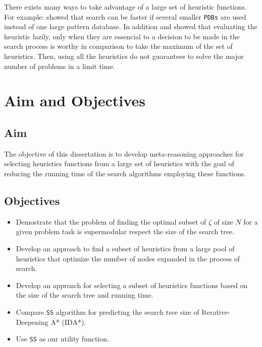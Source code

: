There exists many ways to take advantage of a large set of heuristic functions. For example: \cite{holte2006maximizing} showed that search can be faster if several smaller \texttt{PDBs} are used instead of one large pattern database. In addition \cite{domshlak2010max} and \cite{tolpin2013towards} showed that evaluating the heuristic lazily, only when they are essencial to a decision to be made in the search process is worthy in comparison to take the maximum of the set of heuristics. Then, using all the heuristics do not guarantees to solve the major number of problems in a limit time.
\section{Aim and Objectives}
\subsection{Aim}
\noindent
The objective of this dissertation is to develop meta-reasoning approaches for selecting heuristics functions from a large set of heuristics with the goal of reducing the running time of the search algorithms employing these functions.

\subsection{Objectives}
\noindent

\begin{itemize}
  \item Demostrate that the problem of finding the optimal subset of $\zeta$ of size $N$ for a given problem task is supermodular respect the size of the search tree.
  
  \item Develop an approach to find a subset of heuristics from a large pool of heuristics that optimize the number of nodes expanded in the process of search.
  
  \item Develop an approach for selecting a subset of heuristics functions based on the size of the search tree and running time.

  \item Compare \texttt{SS} algorithm for predicting the search tree size of Iterative-Deepening A* (IDA*).
  
  \item Use \texttt{SS} as our utility function.

\end{itemize}
